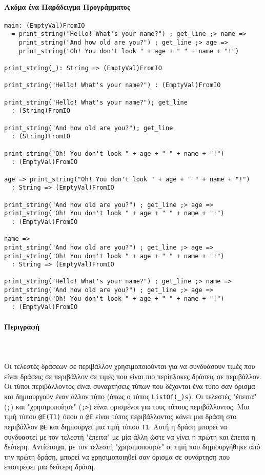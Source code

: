 \documentclass[diploma]{softlab-thesis}
\def\pend{\mbox{}\\\\}
\begin{document}
\newpage
\paragraph{Ακόμα ένα Παράδειγμα Προγράμματος}
\begin{verbatim}
main: (EmptyVal)FromIO
  = print_string("Hello! What's your name?") ; get_line ;> name =>
    print_string("And how old are you?") ; get_line ;> age =>
    print_string("Oh! You don't look " + age + " " + name + "!")

print_string(_): String => (EmptyVal)FromIO

print_string("Hello! What's your name?") : (EmptyVal)FromIO

print_string("Hello! What's your name?"); get_line
  : (String)FromIO

print_string("And how old are you?"); get_line
  : (String)FromIO

print_string("Oh! You don't look " + age + " " + name + "!")
  : (EmptyVal)FromIO

age => print_string("Oh! You don't look " + age + " " + name + "!")
  : String => (EmptyVal)FromIO

print_string("And how old are you?") ; get_line ;> age =>
print_string("Oh! You don't look " + age + " " + name + "!")
  : (EmptyVal)FromIO

name =>
print_string("And how old are you?") ; get_line ;> age =>
print_string("Oh! You don't look " + age + " " + name + "!")
  : String => (EmptyVal)FromIO

print_string("Hello! What's your name?") ; get_line ;> name =>
print_string("And how old are you?") ; get_line ;> age =>
print_string("Oh! You don't look " + age + " " + name + "!")
  : (EmptyVal)FromIO
\end{verbatim}

\paragraph{Περιγραφή}\pend
Οι τελεστές δράσεων σε περιβάλλον χρησιμοποιούνται για να συνδυάσουν τιμές που
είναι δράσεις σε περιβάλλον σε τιμές που είναι πιο περίπλοκες δράσεις σε
περιβάλλον. Οι τύποι περιβάλλοντος είναι συναρτήσεις τύπων που δέχονται ένα
τύπο σαν όρισμα και δημιουργούν έναν άλλον τύπο (όπως ο τύπος
\verb|ListOf(_)s|). Οι τελεστές "έπειτα" (\verb|;|) και "χρησιμοποίησε"
(\verb|;>|) είναι ορισμένοι για τους τύπους περιβάλλοντος. Μια τιμή τύπου
\verb|@E(T1)| όπου ο \verb|@E| είναι τύπος περιβάλλοντος κάνει μια δράση
στο περιβάλλον \verb|@E| και δημιουργεί μια τιμή τύπου \verb|T1|. Αυτή η
δράση μπορεί να συνδυαστεί με τον τελεστή "έπειτα" με μία άλλη ώστε να γίνει
η πρώτη και έπειτα η δεύτερη. Αντίστοιχα, με τον τελεστή "χρησιμοποίησε"
οι τιμή που δημιουργήθηκε από την πρώτη δράση, μπορεί να χρησιμοποιηθεί σαν
όρισμα σε συνάρτηση που επιστρέφει μια δεύτερη δράση.
\end{document}
